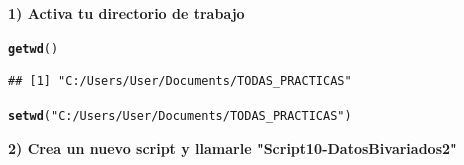 \documentclass[12pt,letterpaper]{article}\usepackage[]{graphicx}\usepackage[]{color}
\makeatletter
\newcommand{\hlstr}[1]{\textcolor[rgb]{0.192,0.494,0.8}{#1}}%
\newcommand{\hlstd}[1]{\textcolor[rgb]{0.345,0.345,0.345}{#1}}%
\newcommand{\hlkwd}[1]{\textcolor[rgb]{0.737,0.353,0.396}{\textbf{#1}}}%
\newenvironment{kframe}{%
 \def\at@end@of@kframe{}%
 \ifinner\ifhmode%
  \def\at@end@of@kframe{\end{minipage}}%
  \begin{minipage}{\columnwidth}%
 \fi\fi%
 \def\FrameCommand##1{\hskip\@totalleftmargin \hskip-\fboxsep
 \colorbox{shadecolor}{##1}\hskip-\fboxsep
     \hskip-\linewidth \hskip-\@totalleftmargin \hskip\columnwidth}%
 \MakeFramed {\advance\hsize-\width
   \@totalleftmargin\z@ \linewidth\hsize
   \@setminipage}}%
 {\par\unskip\endMakeFramed%
 \at@end@of@kframe}
\newenvironment{knitrout}{}{} %
\makeatother
\begin{document}
\textbf{1) Activa tu directorio de trabajo}
\begin{knitrout}
\color{fgcolor}\begin{kframe}
\begin{alltt}
\hlkwd{getwd}\hlstd{()}
\end{alltt}
\begin{verbatim}
## [1] "C:/Users/User/Documents/TODAS_PRACTICAS"
\end{verbatim}
\begin{alltt}
\hlkwd{setwd}\hlstd{(}\hlstr{"C:/Users/User/Documents/TODAS_PRACTICAS"}\hlstd{)}
\end{alltt}
\end{kframe}
\end{knitrout}

\textbf{2) Crea un nuevo script y llamarle "Script10-DatosBivariados2"} \\\\
\end{document}
